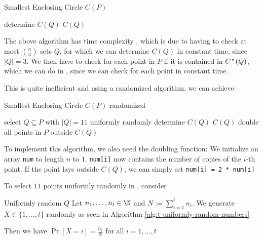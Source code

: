 \begin{algorithm}
    \caption{Smallest Enclosing Circle $C(P)$}
    \begin{algorithmic}[1]
                \State determine $C(Q)$
                    \State \Return $C(Q)$
                \EndIf
            \EndFor
        \EndProcedure
    \end{algorithmic}
\end{algorithm}
The above algorithm has time complexity , which is due to having to check at most ${n \choose 3}$ sets $Q$, for which we can determine $C(Q)$ in constant time, since $|Q| = 3$. We then have to check for each point in $P$ if it is contained in $\cplane(Q)$, which we can do in , since we can check for each point in constant time.

This is quite inefficient and using a randomized algorithm, we can achieve 

\begin{algorithm}
    \caption{Smallest Enclosing Circle $C(P)$ randomized}
    \begin{algorithmic}[1]
                \State select $Q \subseteq P$ with $|Q| = 11$ uniformly randomly
                \State determine $C(Q)$
                    \State \Return $C(Q)$
                \EndIf
                \State double all points in $P$ outside $C(Q)$
            \EndWhile
        \EndProcedure
    \end{algorithmic}
\end{algorithm}
To implement this algorithm, we also need the doubling function: We initialize an array \verb|num| to length $n$ to $1$. \verb|num[i]| now contains the number of copies of the $i$-th point. If the point lays outside $C(Q)$, we can simply set \verb|num[i] = 2 * num[i]|

\newpage
To select $11$ points uniformly randomly in , consider
\begin{lemma}[]{Uniformly random $Q$}
    Let $n_1, \ldots, n_t \in \N$ and $N := \sum_{i = 1}^{t} n_i$. We generate $X \in \{1, \ldots, t\}$ randomly as seen in Algorithm \ref{alg:t-uniformly-random-numbers}

    Then we have $\Pr[X = i] = \frac{n_i}{N}$ for all $i = 1, \ldots, t$
\end{lemma}

